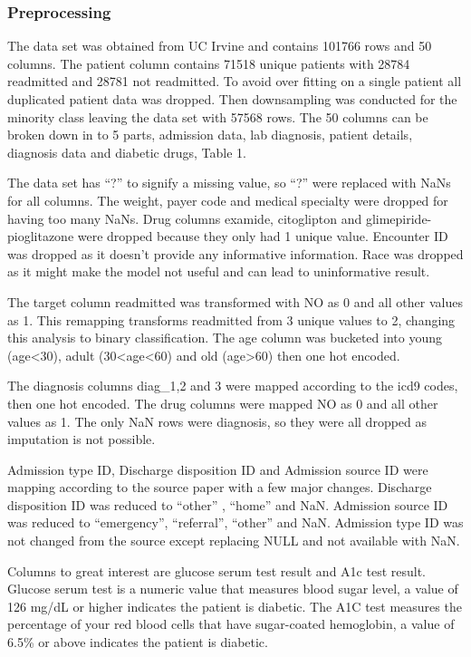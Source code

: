 \documentclass[5p]{elsarticle} %
\begin{document}
\hypertarget{preprocessing}{%
\subsubsection{Preprocessing}\label{preprocessing}}

The data set was obtained from UC Irvine and contains 101766 rows and 50
columns. The patient column contains 71518 unique patients with 28784
readmitted and 28781 not readmitted. To avoid over fitting on a single
patient all duplicated patient data was dropped. Then downsampling was
conducted for the minority class leaving the data set with 57568 rows.
The 50 columns can be broken down in to 5 parts, admission data, lab
diagnosis, patient details, diagnosis data and diabetic drugs, Table 1.

The data set has ``?'' to signify a missing value, so ``?'' were
replaced with NaNs for all columns. The weight, payer code and medical
specialty were dropped for having too many NaNs. Drug columns examide,
citoglipton and glimepiride-pioglitazone were dropped because they only
had 1 unique value. Encounter ID was dropped as it doesn't provide any
informative information. Race was dropped as it might make the model not
useful and can lead to uninformative result.

The target column readmitted was transformed with NO as 0 and all other
values as 1. This remapping transforms readmitted from 3 unique values
to 2, changing this analysis to binary classification. The age column
was bucketed into young (age\textless30), adult
(30\textless age\textless60) and old (age\textgreater60) then one hot
encoded.

The diagnosis columns diag\_1,2 and 3 were mapped according to the icd9
codes, then one hot encoded. The drug columns were mapped NO as 0 and
all other values as 1. The only NaN rows were diagnosis, so they were
all dropped as imputation is not possible.

Admission type ID, Discharge disposition ID and Admission source ID were
mapping according to the source paper with a few major changes.
Discharge disposition ID was reduced to ``other'' , ``home'' and NaN.
Admission source ID was reduced to ``emergency'', ``referral'',
``other'' and NaN. Admission type ID was not changed from the source
except replacing NULL and not available with NaN.

Columns to great interest are glucose serum test result and A1c test
result. Glucose serum test is a numeric value that measures blood sugar
level, a value of 126 mg/dL or higher indicates the patient is diabetic.
The A1C test measures the percentage of your red blood cells that have
sugar-coated hemoglobin, a value of 6.5\% or above indicates the patient
is diabetic.
\end{document}
